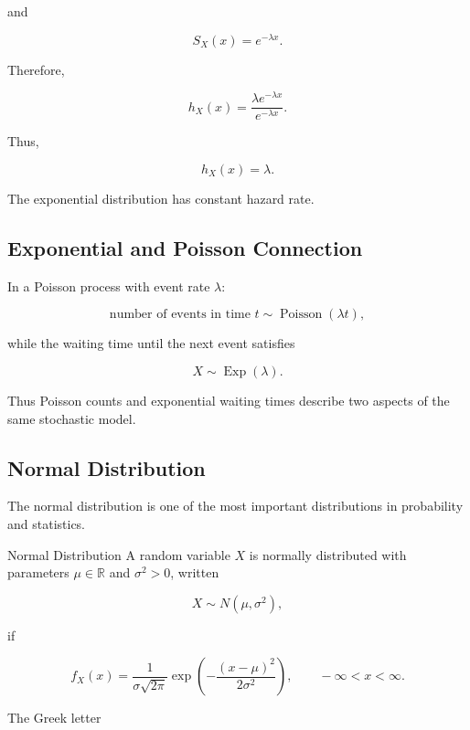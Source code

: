 and

\[
S_X(x)
=
e^{-\lambda x}.
\]

Therefore,

\[
h_X(x)
=
\frac{
\lambda e^{-\lambda x}
}{
e^{-\lambda x}
}.
\]

Thus,

\[
\boxed{
h_X(x)=\lambda.
}
\]

The exponential distribution has constant hazard rate.

\subsection{Exponential and Poisson Connection}
\label{subsec:exponential-poisson-connection}

In a Poisson process with event rate \(\lambda\):

\[
\boxed{
\text{number of events in time }t
\sim
\operatorname{Poisson}(\lambda t),
}
\]

while the waiting time until the next event satisfies

\[
\boxed{
X\sim\operatorname{Exp}(\lambda).
}
\]

Thus Poisson counts and exponential waiting times describe two aspects of
the same stochastic model.

\subsection{Normal Distribution}
\label{subsec:normal-distribution}

The normal distribution is one of the most important distributions in
probability and statistics.

\begin{definitionbox}{Normal Distribution}
A random variable \(X\) is normally distributed with parameters
\(\mu\in\mathbb{R}\) and \(\sigma^2>0\), written

\[
\boxed{
X\sim N(\mu,\sigma^2),
}
\]

if

\[
\boxed{
f_X(x)
=
\frac{1}{\sigma\sqrt{2\pi}}
\exp
\left(
-\frac{(x-\mu)^2}{2\sigma^2}
\right),
\qquad
-\infty<x<\infty.
}
\]
\end{definitionbox}

The Greek letter

